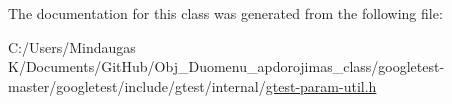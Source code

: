 The documentation for this class was generated from the following file\+:\begin{DoxyCompactItemize}
\item 
C\+:/\+Users/\+Mindaugas K/\+Documents/\+Git\+Hub/\+Obj\+\_\+\+Duomenu\+\_\+apdorojimas\+\_\+class/googletest-\/master/googletest/include/gtest/internal/\mbox{\hyperlink{googletest-master_2googletest_2include_2gtest_2internal_2gtest-param-util_8h}{gtest-\/param-\/util.\+h}}\end{DoxyCompactItemize}
